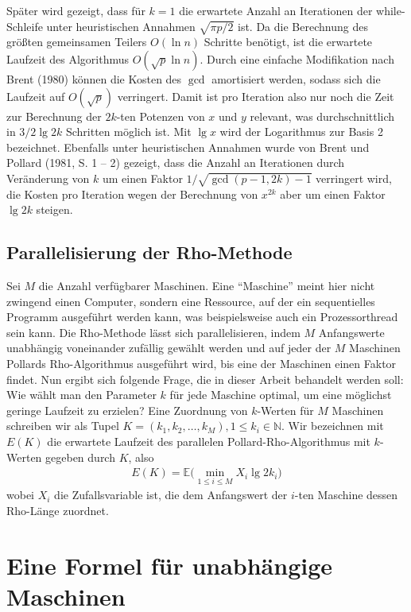 \documentclass[a4paper, 10pt, ngerman]{article}
\newcommand{\N}{\mathbb{N}}
\newcommand{\E}{\mathbb{E}}
\begin{document}
\noindent Später wird gezeigt, dass für $k = 1$ die erwartete Anzahl an Iterationen der while-Schleife unter heuristischen Annahmen $\sqrt{\pi p / 2}$ ist. Da die Berechnung des größten gemeinsamen Teilers $O(\ln n)$ Schritte benötigt, ist die erwartete Laufzeit des Algorithmus $O(\sqrt p \ln n)$. Durch eine einfache Modifikation nach Brent (1980) können die Kosten des $\gcd$ amortisiert werden, sodass sich die Laufzeit auf $O(\sqrt p)$ verringert. Damit ist pro Iteration also nur noch die Zeit zur Berechnung der $2k$-ten Potenzen von $x$ und $y$ relevant, was durchschnittlich in $3/2 \lg 2k$ Schritten möglich ist. Mit $\lg x$ wird der Logarithmus zur Basis 2 bezeichnet. Ebenfalls unter heuristischen Annahmen wurde von Brent und Pollard (1981, S. 1 -- 2) gezeigt, dass die Anzahl an Iterationen durch Veränderung von $k$ um einen Faktor $1/\sqrt{\gcd(p - 1, 2k) - 1}$ verringert wird, die Kosten pro Iteration wegen der Berechnung von $x^{2k}$ aber um einen Faktor $\lg 2k$ steigen.

\subsection{Parallelisierung der Rho-Methode}

Sei $M$ die Anzahl verfügbarer Maschinen. Eine "`Maschine"'  meint hier nicht zwingend einen Computer, sondern eine Ressource, auf der ein sequentielles Programm ausgeführt werden kann, was beispielsweise auch ein Prozessorthread sein kann. Die Rho-Methode lässt sich parallelisieren, indem $M$ Anfangswerte unabhängig voneinander zufällig gewählt werden und auf jeder der $M$ Maschinen Pollards Rho-Algorithmus ausgeführt wird, bis eine der Maschinen einen Faktor findet. Nun ergibt sich folgende Frage, die in dieser Arbeit behandelt werden soll: Wie wählt man den Parameter $k$ für jede Maschine optimal, um eine möglichst geringe Laufzeit zu erzielen? Eine Zuordnung von $k$-Werten für $M$ Maschinen schreiben wir als Tupel $K = (k_1, k_2, \dots, k_M), 1 \le k_i \in \N$. Wir bezeichnen mit $E(K)$ die erwartete Laufzeit des parallelen Pollard-Rho-Algorithmus mit $k$-Werten gegeben durch $K$, also
\begin{align*}
    E(K) = \E \bigg ( \min_{1 \le i \le M} X_i \lg 2k_i \bigg )
\end{align*}
wobei $X_i$ die Zufallsvariable ist, die dem Anfangswert der $i$-ten Maschine dessen Rho-Länge zuordnet.

\section{Eine Formel für unabhängige Maschinen}
\end{document}
